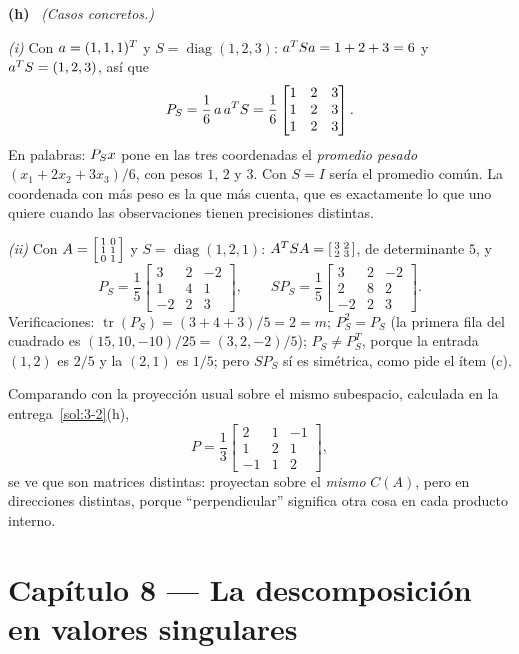 \documentclass[11pt,a4paper]{article}
\DeclareMathOperator{\tr}{tr}
\DeclareMathOperator{\diag}{diag}
\newcounter{entrega}[section]
\newcommand{\itemsol}[1]{\par\medskip\noindent\textbf{(#1)}\ \ignorespaces}
\begin{document}
\itemsol{h} \emph{(Casos concretos.)}

\emph{(i)} Con $a=(1,1,1)^T$ y $S=\diag(1,2,3)$: $a^TSa=1+2+3=6$ y
$a^TS=(1,2,3)$, así que
\[
P_S=\frac{1}{6}\,a\,a^TS
=\frac16\begin{bmatrix}1&2&3\\ 1&2&3\\ 1&2&3\end{bmatrix}.
\]
En palabras: $P_Sx$ pone en las tres coordenadas el \emph{promedio pesado}
$(x_1+2x_2+3x_3)/6$, con pesos $1$, $2$ y $3$. Con $S=I$ sería el promedio común.
La coordenada con más peso es la que más cuenta, que es exactamente lo que uno
quiere cuando las observaciones tienen precisiones distintas.

\emph{(ii)} Con $A=\begin{bsmallmatrix}1&0\\1&1\\0&1\end{bsmallmatrix}$ y
$S=\diag(1,2,1)$: $A^TSA=\begin{bsmallmatrix}3&2\\2&3\end{bsmallmatrix}$, de
determinante $5$, y
\[
P_S=\frac15\begin{bmatrix}3&2&-2\\ 1&4&1\\ -2&2&3\end{bmatrix},
\qquad
SP_S=\frac15\begin{bmatrix}3&2&-2\\ 2&8&2\\ -2&2&3\end{bmatrix}.
\]
Verificaciones: $\tr(P_S)=(3+4+3)/5=2=m$; $P_S^2=P_S$ (la primera fila del
cuadrado es $(15,10,-10)/25=(3,2,-2)/5$); $P_S\neq P_S^T$, porque la entrada
$(1,2)$ es $2/5$ y la $(2,1)$ es $1/5$; pero $SP_S$ sí es simétrica, como pide el
ítem (c).

Comparando con la proyección usual sobre el mismo subespacio, calculada en la
entrega~\ref{sol:3-2}(h),
\[
P=\frac13\begin{bmatrix}2&1&-1\\ 1&2&1\\ -1&1&2\end{bmatrix},
\]
se ve que son matrices distintas: proyectan sobre el \emph{mismo} $C(A)$, pero en
direcciones distintas, porque ``perpendicular'' significa otra cosa en cada
producto interno.


\clearpage
\section{Capítulo 8 --- La descomposición en valores singulares}
\setcounter{entrega}{0}
\end{document}
